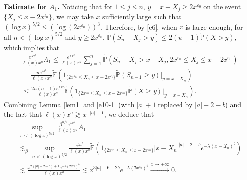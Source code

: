 \documentclass[11pt]{article}
\numberwithin{equation}{section}
\begin{document}
\noindent
{\bf Estimate for $A_1$.}
 Noticing that for $1\leq j\leq n$, $y=x-X_j\geq 2x^{\varepsilon_0}$ on the event $\{X_j\leq x-2x^{\varepsilon_0}\}$, we may take $x$ sufficiently large such that $(\log x)^{5/2}\leq (\log (2x^{\varepsilon_0}))^3$. Therefore, by  \eqref{e6}, when $x$ is large enough, for all $n< (\log x)^{5/2}$ and $y\geq 2x^{\varepsilon_0}$, $\widetilde{\mathbb{P}}(S_{n}-X_j>y) \leq 2 (n-1) \widetilde{\mathbb{P}}(X>y)$, which implies that  
\begin{align}
	& \frac{ e^{\lambda x^b}}{\ell(x) x^a }  A_1 \leq \frac{e^{\lambda x^b}}{\ell(x) x^a }  \sum_{j=1}^n \widetilde{\mathbb{P}}\left(S_{n}-X_j> x- X_j, 2x^{\varepsilon_0}\leq  X_j \leq x-2 x^{\varepsilon_0} \right) \nonumber\\
	& = \frac{ ne^{\lambda x^b}}{\ell(x) x^a } \widetilde{\mathbb{E}}\left(1_{\{ 2x^{\varepsilon_0}\leq X_n \leq x-2 x^{\varepsilon_0}\}} \widetilde{\mathbb{P}} (S_{n-1}\geq y)|_{y=x-X_n} \right)\nonumber\\
	& \leq \frac{ 2n(n-1) e^{\lambda x^b}}{\ell(x) x^a } \widetilde{\mathbb{E}}\left(1_{\{ 2x^{\varepsilon_0}\leq  X_n \leq x-2 x^{\varepsilon_0}\}} \widetilde{\mathbb{P}} (X\geq y)|_{y=x-X_n} \right).
\end{align}
 Combining   Lemma \ref{lem1} and \eqref{e10-1} (with $|a|+1$ replaced by $|a|+2-b$) and the fact that $\ell(x) x^{a}\gtrsim x^{-|a|-1}$, we deduce that 
\begin{align}\label{e21-4}
	& \sup_{n< (\log x)^{5/2}}\frac{ \beta^{n/2} e^{\lambda x^b}}{\ell(x) x^a } A_1 \nonumber\\
	&\lesssim_\beta \sup_{n< (\log x)^{5/2}} \frac{ e^{\lambda x^b}}{\ell(x) x^a } \widetilde{\mathbb{E}}\left(1_{\{ 2x^{\varepsilon_0}\leq  X_n \leq x-2 x^{\varepsilon_0}\}} |x-X_n|^{|a|+2-b} e^{-\lambda (x-X_n)^{b}} \right)\nonumber\\
	&\lesssim \frac{  x^{2(|a|+2-b) +1} e^{-\lambda (2x^{\varepsilon_0})^{b}} }{\ell(x) x^a } \lesssim   x^{3|a|+6-2b}   e^{-\lambda (2x^{\varepsilon_0})^{b}}\stackrel{x\to+\infty}{\longrightarrow}0.
\end{align}
\end{document}
